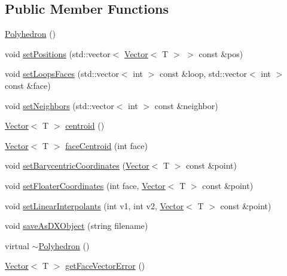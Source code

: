 \subsection*{Public Member Functions}
\begin{DoxyCompactItemize}
\item 
\hyperlink{classccmc_1_1_polyhedron_addb2fac41e80420f07ea9b3164cd11af}{Polyhedron} ()
\item 
void \hyperlink{classccmc_1_1_polyhedron_aa3d13c560359c24af71e2c5b1b159148}{set\-Positions} (std\-::vector$<$ \hyperlink{classccmc_1_1_vector}{Vector}$<$ T $>$ $>$ const \&pos)
\item 
void \hyperlink{classccmc_1_1_polyhedron_a54003232c80e3137ecb2e4732e00d3a4}{set\-Loops\-Faces} (std\-::vector$<$ int $>$ const \&loop, std\-::vector$<$ int $>$ const \&face)
\item 
void \hyperlink{classccmc_1_1_polyhedron_aac7c881c60c5ee50ec85c5ac6e6c02f6}{set\-Neighbors} (std\-::vector$<$ int $>$ const \&neighbor)
\item 
\hyperlink{classccmc_1_1_vector}{Vector}$<$ T $>$ \hyperlink{classccmc_1_1_polyhedron_a6395204653dddbd1148023ce3c04b647}{centroid} ()
\item 
\hyperlink{classccmc_1_1_vector}{Vector}$<$ T $>$ \hyperlink{classccmc_1_1_polyhedron_a587cce21871193ccfba1a7fadc2eb86b}{face\-Centroid} (int face)
\item 
void \hyperlink{classccmc_1_1_polyhedron_ab0619f44fb68fae79dc86498164a5255}{set\-Barycentric\-Coordinates} (\hyperlink{classccmc_1_1_vector}{Vector}$<$ T $>$ const \&point)
\item 
void \hyperlink{classccmc_1_1_polyhedron_a32c4243a5f5dd6993d17f60e3deeda38}{set\-Floater\-Coordinates} (int face, \hyperlink{classccmc_1_1_vector}{Vector}$<$ T $>$ const \&point)
\item 
void \hyperlink{classccmc_1_1_polyhedron_af312e09c40b05c1bd376f94e3966103a}{set\-Linear\-Interpolants} (int v1, int v2, \hyperlink{classccmc_1_1_vector}{Vector}$<$ T $>$ const \&point)
\item 
void \hyperlink{classccmc_1_1_polyhedron_a3d1633e9643f81644e3e0df64f4195ca}{save\-As\-D\-X\-Object} (string filename)
\item 
virtual \hyperlink{classccmc_1_1_polyhedron_a0d70cc8f2c26b2fcc6589b66f00e3ab1}{$\sim$\-Polyhedron} ()
\item 
\hyperlink{classccmc_1_1_vector}{Vector}$<$ T $>$ \hyperlink{classccmc_1_1_polyhedron_a2c7464ff7c021b3b7aafaf3739217110}{get\-Face\-Vector\-Error} ()
\item 

\end{DoxyCompactItemize}
